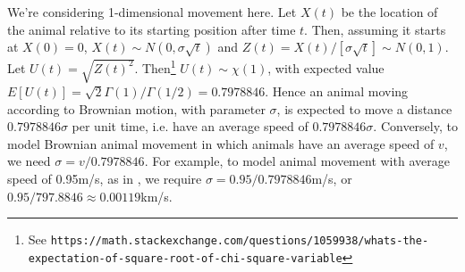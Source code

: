 \documentclass[useAMS, usenatbib, referee]{biom}\usepackage[]{graphicx}\usepackage[]{color}
\begin{document}
We're considering 1-dimensional movement here. Let $X(t)$ be the location of the animal relative to its starting position after time $t$. Then, assuming it starts at $X(0)=0$, $X(t)\sim N(0,\sigma\sqrt{t})$ and $Z(t)=X(t)/[\sigma\sqrt{t}]\sim N(0,1)$. Let $U(t)=\sqrt{Z(t)^2}$. Then\footnote{See \texttt{https://math.stackexchange.com/questions/1059938/whats-the-expectation-of-square-root-of-chi-square-variable}} $U(t)\sim\chi(1)$, with expected value $E[U(t)]=\sqrt{2}\Gamma(1)/\Gamma(1/2)=0.7978846$. Hence an animal moving according to Brownian motion, with parameter $\sigma$, is expected to move a distance $0.7978846\sigma$ per unit time, i.e. have an average speed of $0.7978846\sigma$. Conversely, to model Brownian animal movement in which animals have an average speed of $v$, we need $\sigma=v/0.7978846$. For example, to model animal movement with average speed of 0.95m/s, as in \cite{Stevenson+al:18}, we require $\sigma=0.95/0.7978846$m/s, or $0.95/797.8846\approx 0.00119$km/s.


 


\end{document}
